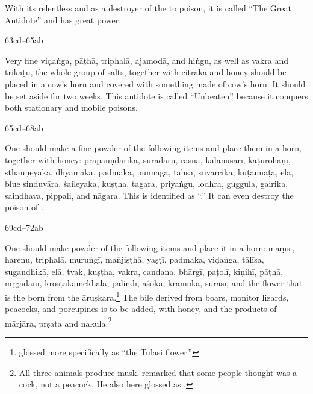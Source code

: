 \begin{translation}
\begin{sloka}
With its relentless  and as a destroyer of the
 to poison, it is called “The Great Antidote”
and has great power.
\end{sloka} 

\item[63cd--65ab]

\begin{sloka}
Very fine \gls{viḍaṅga}, \gls{pāṭhā}, \gls{triphalā}, \gls{ajamodā},
and \gls{hiṅgu}, as well as \gls{vakra} and \gls{trikaṭu}, the whole
group of salts, together with \gls{citraka} and honey should be placed
in a cow's horn and covered with something made of cow's horn.  It
should be set aside for two weeks. %
This antidote is called “Unbeaten” because it conquers  both
stationary and mobile poisons.
\end{sloka}

\item [65cd--68ab]

\begin{sloka}
One should make a fine powder of the following items and place them in a 
horn, together with honey: %
\gls{prapauṇḍarīka},
\gls{suradāru},
\gls{rāsnā},
\gls{kālānusārī},
\gls{kaṭurohaṇī},
\gls{sthauṇeyaka}, 
\gls{dhyāmaka},
\gls{padmaka}, 
\gls{punnāga},
\gls{tālīsa}, 
\gls{suvarcikā},
\gls{kuṭannaṭa}, 
\gls{elā},
blue \gls{sinduvāra}, 
\gls{śaileyaka},
\gls{kuṣṭha},
\gls{tagara},
\gls{priyaṅgu},
\gls{lodhra},
\gls{guggula}, 
\gls{gairika}, 
\gls{saindhava}, %
\gls{pippali}, 
and 
\gls{nāgara}.  This  is identified as 
“.” It can even destroy the poison of  .
\end{sloka}


\item [69cd--72ab] 

\begin{sloka}
One should make powder of the following items and place it in a 
horn:
\gls{māṃsī},
\gls{hareṇu},
\gls{triphalā},
\gls{muruṅgī},
\gls{mañjiṣṭhā},
\gls{yaṣṭī},
\gls{padmaka},
\gls{viḍaṅga},
\gls{tālīsa},
\gls{sugandhikā},
\gls{elā},
\gls{tvak},
\gls{kuṣṭha},
\gls{vakra}, 
\gls{candana}, 
\gls{bhārgī}, 
\gls{paṭolī},
\gls{kiṇihī}, 
\gls{pāṭhā},
\gls{mṛgādanī},
\gls{kroṣṭakamekhalā}, 
\gls{pālindī}, 
\gls{aśoka}, 
\gls{kramuka}, 
\gls{surasī},
and the flower that is the  born from the 
\gls{āruṣkara}.\footnote{ glossed  more 
specifically as  “the Tulasi flower.”} 
The bile derived from boars, monitor lizards, peacocks, and 
porcupines is to be added, with honey, and the products 
of \gls{mārjāra}, \gls{pṛṣata} and \gls{nakula}.\footnote{All three animals 
produce musk.    remarked that some people thought 
 was a cock, not a peacock.  He also here glossed  as 
.}  


\end{sloka}
\end{translation}
